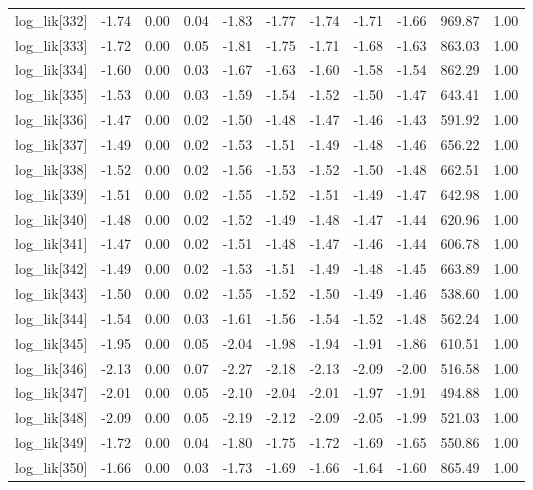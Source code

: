 \begin{table}[ht]
\begin{tabular}{rrrrrrrrrrr}
  log\_lik[332] & -1.74 & 0.00 & 0.04 & -1.83 & -1.77 & -1.74 & -1.71 & -1.66 & 969.87 & 1.00 \\ 
  log\_lik[333] & -1.72 & 0.00 & 0.05 & -1.81 & -1.75 & -1.71 & -1.68 & -1.63 & 863.03 & 1.00 \\ 
  log\_lik[334] & -1.60 & 0.00 & 0.03 & -1.67 & -1.63 & -1.60 & -1.58 & -1.54 & 862.29 & 1.00 \\ 
  log\_lik[335] & -1.53 & 0.00 & 0.03 & -1.59 & -1.54 & -1.52 & -1.50 & -1.47 & 643.41 & 1.00 \\ 
  log\_lik[336] & -1.47 & 0.00 & 0.02 & -1.50 & -1.48 & -1.47 & -1.46 & -1.43 & 591.92 & 1.00 \\ 
  log\_lik[337] & -1.49 & 0.00 & 0.02 & -1.53 & -1.51 & -1.49 & -1.48 & -1.46 & 656.22 & 1.00 \\ 
  log\_lik[338] & -1.52 & 0.00 & 0.02 & -1.56 & -1.53 & -1.52 & -1.50 & -1.48 & 662.51 & 1.00 \\ 
  log\_lik[339] & -1.51 & 0.00 & 0.02 & -1.55 & -1.52 & -1.51 & -1.49 & -1.47 & 642.98 & 1.00 \\ 
  log\_lik[340] & -1.48 & 0.00 & 0.02 & -1.52 & -1.49 & -1.48 & -1.47 & -1.44 & 620.96 & 1.00 \\ 
  log\_lik[341] & -1.47 & 0.00 & 0.02 & -1.51 & -1.48 & -1.47 & -1.46 & -1.44 & 606.78 & 1.00 \\ 
  log\_lik[342] & -1.49 & 0.00 & 0.02 & -1.53 & -1.51 & -1.49 & -1.48 & -1.45 & 663.89 & 1.00 \\ 
  log\_lik[343] & -1.50 & 0.00 & 0.02 & -1.55 & -1.52 & -1.50 & -1.49 & -1.46 & 538.60 & 1.00 \\ 
  log\_lik[344] & -1.54 & 0.00 & 0.03 & -1.61 & -1.56 & -1.54 & -1.52 & -1.48 & 562.24 & 1.00 \\ 
  log\_lik[345] & -1.95 & 0.00 & 0.05 & -2.04 & -1.98 & -1.94 & -1.91 & -1.86 & 610.51 & 1.00 \\ 
  log\_lik[346] & -2.13 & 0.00 & 0.07 & -2.27 & -2.18 & -2.13 & -2.09 & -2.00 & 516.58 & 1.00 \\ 
  log\_lik[347] & -2.01 & 0.00 & 0.05 & -2.10 & -2.04 & -2.01 & -1.97 & -1.91 & 494.88 & 1.00 \\ 
  log\_lik[348] & -2.09 & 0.00 & 0.05 & -2.19 & -2.12 & -2.09 & -2.05 & -1.99 & 521.03 & 1.00 \\ 
  log\_lik[349] & -1.72 & 0.00 & 0.04 & -1.80 & -1.75 & -1.72 & -1.69 & -1.65 & 550.86 & 1.00 \\ 
  log\_lik[350] & -1.66 & 0.00 & 0.03 & -1.73 & -1.69 & -1.66 & -1.64 & -1.60 & 865.49 & 1.00 \\ 

\end{tabular}
\end{table}
